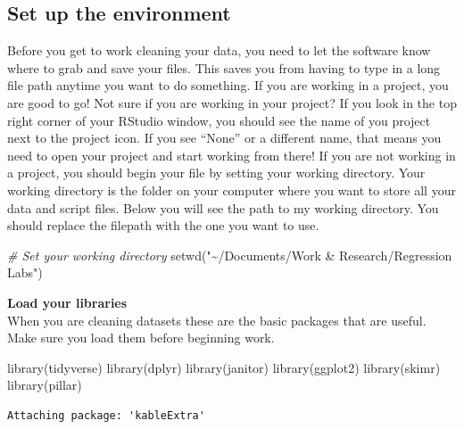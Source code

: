 \documentclass[
]{book}
\newenvironment{Shaded}{\begin{snugshade}}{\end{snugshade}}
\newcommand{\CommentTok}[1]{\textcolor[rgb]{0.56,0.35,0.01}{\textit{#1}}}
\newcommand{\FunctionTok}[1]{\textcolor[rgb]{0.00,0.00,0.00}{#1}}
\newcommand{\NormalTok}[1]{#1}
\newcommand{\StringTok}[1]{\textcolor[rgb]{0.31,0.60,0.02}{#1}}
\begin{document}
\hypertarget{environment}{%
\subsection*{Set up the environment}\label{environment}}

Before you get to work cleaning your data, you need to let the software know where to grab and save your files. This saves you from having to type in a long file path anytime you want to do something. If you are working in a project, you are good to go! Not sure if you are working in your project? If you look in the top right corner of your RStudio window, you should see the name of you project next to the project icon. If you see ``None'' or a different name, that means you need to open your project and start working from there!
If you are not working in a project, you should begin your file by setting your working directory. Your working directory is the folder on your computer where you want to store all your data and script files. Below you will see the path to my working directory. You should replace the filepath with the one you want to use.

\begin{Shaded}
\begin{Highlighting}[]
\CommentTok{\# Set your working directory }
\FunctionTok{setwd}\NormalTok{(}\StringTok{"\textasciitilde{}/Documents/Work \& Research/Regression Labs"}\NormalTok{)}
\end{Highlighting}
\end{Shaded}

\textbf{Load your libraries}\\
When you are cleaning datasets these are the basic packages that are useful. Make sure you load them before beginning work.

\begin{Shaded}
\begin{Highlighting}[]
\FunctionTok{library}\NormalTok{(tidyverse)}
\FunctionTok{library}\NormalTok{(dplyr)}
\FunctionTok{library}\NormalTok{(janitor)}
\FunctionTok{library}\NormalTok{(ggplot2)}
\FunctionTok{library}\NormalTok{(skimr)}
\FunctionTok{library}\NormalTok{(pillar)}
\end{Highlighting}
\end{Shaded}

\begin{verbatim}
Attaching package: 'kableExtra'
\end{verbatim}
\end{document}
